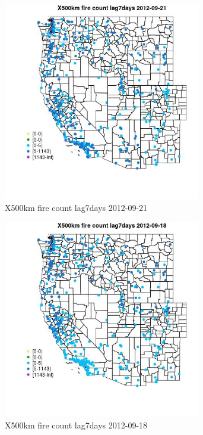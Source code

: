 \begin{figure} 
\centering  
\includegraphics[width=0.77\textwidth]{Code_Outputs/Report_ML_input_PM25_Step4_part_e_de_duplicated_aves_compiled_2019-05-14wNAs_MapObsX500km_fire_count_lag7days2012-09-21.jpg} 
\caption{\label{fig:Report_ML_input_PM25_Step4_part_e_de_duplicated_aves_compiled_2019-05-14wNAsMapObsX500km_fire_count_lag7days2012-09-21}X500km fire count lag7days 2012-09-21} 
\end{figure} 
 

\clearpage 

\begin{figure} 
\centering  
\includegraphics[width=0.77\textwidth]{Code_Outputs/Report_ML_input_PM25_Step4_part_e_de_duplicated_aves_compiled_2019-05-14wNAs_MapObsX500km_fire_count_lag7days2012-09-18.jpg} 
\caption{\label{fig:Report_ML_input_PM25_Step4_part_e_de_duplicated_aves_compiled_2019-05-14wNAsMapObsX500km_fire_count_lag7days2012-09-18}X500km fire count lag7days 2012-09-18} 
\end{figure} 
 

